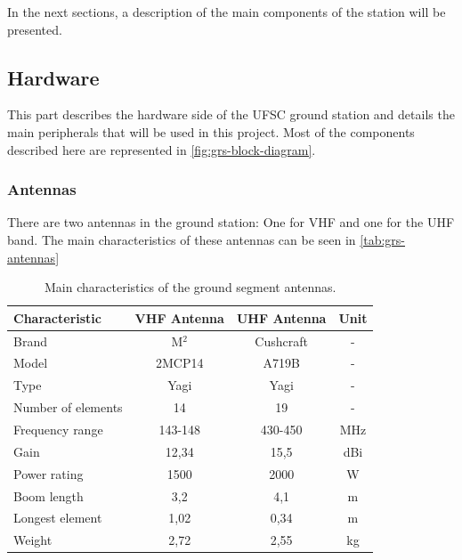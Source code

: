In the next sections, a description of the main components of the station will be presented.

\subsection{Hardware}

This part describes the hardware side of the UFSC ground station and details the main peripherals that will be used in this project. Most of the components described here are represented in \autoref{fig:grs-block-diagram}.

\subsubsection{Antennas}

There are two antennas in the ground station: One for VHF and one for the UHF band. The main characteristics of these antennas can be seen in \autoref{tab:grs-antennas}

\begin{table}[ht]
    \centering
    \begin{tabular}{lccc}
        \toprule[1.5pt]
        \textbf{Characteristic} & \textbf{VHF Antenna}  & \textbf{UHF Antenna}  & \textbf{Unit} \\
        \midrule
        Brand                   & M$^{2}$               & Cushcraft             & - \\
        Model                   & 2MCP14                & A719B                 & - \\
        Type                    & Yagi                  & Yagi                  & - \\
        Number of elements      & 14                    & 19                    & - \\
        Frequency range         & 143-148               & 430-450               & MHz \\
        Gain                    & 12,34                 & 15,5                  & dBi \\
        Power rating            & 1500                  & 2000                  & W \\
        Boom length             & 3,2                   & 4,1                   & m \\
        Longest element         & 1,02                  & 0,34                  & m \\
        Weight                  & 2,72                  & 2,55                  & kg \\
        \bottomrule[1.5pt]
    \end{tabular}
    \caption{Main characteristics of the ground segment antennas.}
    \label{tab:grs-antennas}
\end{table}

